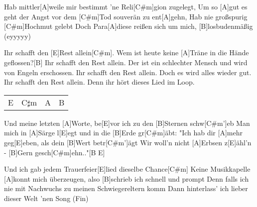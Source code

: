 \begin{guitar}
	Hab mittler[A]weile mir bestimmt 'ne Reli[C#m]gion zugelegt,
	Um so [A]gut es geht der Angst vor dem [C#m]Tod souverän zu ent[A]gehn,
	Hab nie großspurig [C#m]Hochmut gelebt
	Doch Para[A]diese reißen sich um mich, [B]losbudenmäßig (eyyyyy)
	
	\begin{highlightbar}
		Ihr schafft den [E]Rest allein[C#m].
		Wem ist heute keine [A]Träne in die Hände geflossen?[B]{}
		Ihr schafft den Rest allein.
		Der ist ein schlechter Mensch und wird von Engeln erschossen.
		Ihr schafft den Rest allein.
		Doch es wird alles wieder gut.
		Ihr schafft den Rest allein.
		Denn ihr hört dieses Lied im Loop.
	\end{highlightbar}
	
	{\footnotesize\begin{tabular}{|l|l|l|l|}
			E & C$\sharp$m & A & B
	\end{tabular} }
	\pagebreak
	Und meine letzten [A]Worte, be[E]vor ich zu den [B]Sternen schw[C#m']eb
	Man mich in [A]Särge l[E]egt und in die [B]Erde gr[C#m]{ä}bt:
	"Ich hab dir [A]mehr geg[E]eben, als dein [B]Wert betr[C#m']{ä}gt
	Wir woll'n nicht [A]Erbsen z[E]{ä}hl'n - [B]Gern gesch[C#m]ehn.."[B E]{}
	
	Und ich gab jedem Trauerfeier[E]lied dieselbe Chance[C#m]{}
	Keine Musikkapelle [A]konnt mich überzeugen, also [B]schrieb ich schnell und prompt\vspace*{-0.25em}
	Denn falls ich nie mit Nachwuchs zu meinen Schwiegereltern komm
	Dann hinterlass' ich lieber dieser Welt 'nen Song (Fin)
\end{guitar}